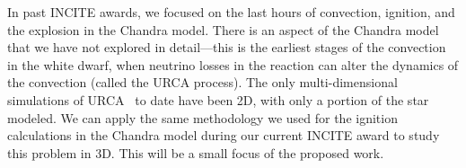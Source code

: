 In past INCITE awards, we focused on the last hours of
convection, ignition, and the explosion in the Chandra model.  There
is an aspect of the Chandra model that we have not explored in
detail---this is the earliest stages of the convection in the white
dwarf, when neutrino losses in the reaction can alter the dynamics of
the convection (called the URCA process).  The only multi-dimensional
simulations of URCA~\cite{URCA} to date have been 2D, with only a
portion of the star modeled.  We can apply the same methodology we
used for the ignition calculations in the Chandra model during our
current INCITE award to study this problem in 3D.  This will be a
small focus of the proposed work.

